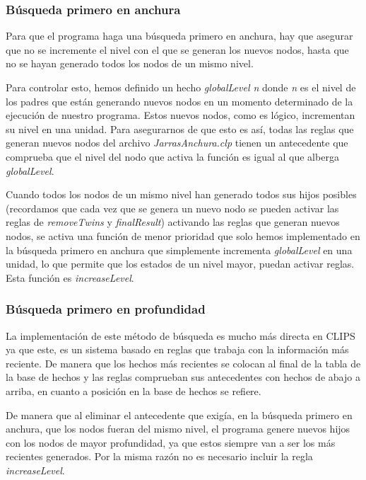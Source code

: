 \documentclass[11pt,a4paper,final]{article}
\begin{document}
\subsubsection{Búsqueda primero en anchura} \label{anchura}
Para que el programa haga una búsqueda primero en anchura, hay que asegurar que no se incremente el nivel con el que se generan los nuevos nodos, hasta que no se hayan generado todos los nodos de un mismo nivel. 

Para controlar esto, hemos definido un hecho \emph{globalLevel n} donde \emph{n} es el nivel de los padres que están generando nuevos nodos en un momento determinado de la ejecución de nuestro programa. Estos nuevos nodos, como es lógico, incrementan su nivel en una unidad. Para asegurarnos de que esto es así, todas las reglas que generan nuevos nodos del archivo \emph{JarrasAnchura.clp} tienen un antecedente que comprueba que el nivel del nodo que activa la función es igual al que alberga \emph{globalLevel}.

Cuando todos los nodos de un mismo nivel han generado todos sus hijos posibles (recordamos que cada vez que se genera un nuevo nodo se pueden activar las reglas de \emph{removeTwins} y \emph{finalResult}) activando las reglas que generan nuevos nodos, se activa una función de menor prioridad que solo hemos implementado en la búsqueda primero en anchura que simplemente incrementa \emph{globalLevel} en una unidad, lo que permite que los estados de un nivel mayor, puedan activar reglas. Esta función es \emph{increaseLevel}.

\subsubsection{Búsqueda primero en profundidad} \label{profundidad} 
La implementación de este método de búsqueda es mucho más directa en CLIPS ya que este, es un sistema basado en reglas que trabaja con la información más reciente. De manera que los hechos más recientes se colocan al final de la tabla de la base de hechos y las reglas comprueban sus antecedentes con hechos de abajo a arriba, en cuanto a posición en la base de hechos se refiere.

De manera que al eliminar el antecedente que exigía, en la búsqueda primero en anchura, que los nodos fueran del mismo nivel, el programa genere nuevos hijos con los nodos de mayor profundidad, ya que estos siempre van a ser los más recientes generados. Por la misma razón no es necesario incluir la regla \emph{increaseLevel}.
\end{document}
